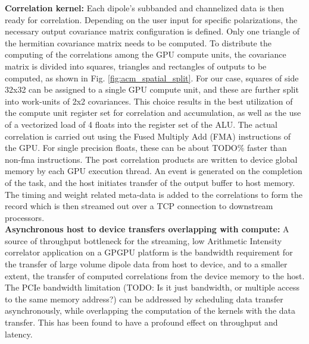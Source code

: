 \documentclass{ws-jai}
\begin{document}
\noindent \textbf {Correlation kernel:}  Each dipole's subbanded and channelized
data is  then ready for correlation.   Depending on the user  input for specific
polarizations,  the   necessary  output   covariance  matrix   configuration  is
defined.  Only one  triangle  of the  hermitian covariance  matrix  needs to  be
computed. To distribute the computing of  the correlations among the GPU compute
units, the covariance  matrix is divided into squares,  triangles and rectangles
of outputs  to be computed,  as shown in Fig.   \ref{fig:acm_spatial_split}. For
our case, squares  of side 32x32 can  be assigned to a single  GPU compute unit,
and these  are further  split into  work-units of  2x2 covariances.  This choice
results in the best utilization of the compute unit register set for correlation
and accumulation, as well  as the use of a vectorized load of  4 floats into the
register set of the ALU.  The actual  correlation is carried out using the Fused
Multiply Add (FMA) instructions of the  GPU.  For single precision floats, these
can  be about  TODO\% faster  than non-fma  instructions.  The  post correlation
products are written  to device global memory by each  GPU execution thread.  An
event  is generated  on  the completion  of  the task,  and  the host  initiates
transfer of  the output  buffer to  host memory. The  timing and  weight related
meta-data is added to the correlations to form the record which is then streamed
out over a TCP connection to downstream processors.\\

\noindent  \textbf  {Asynchronous  host  to device  transfers  overlapping  with
  compute:} A source of throughput  bottleneck for the streaming, low Arithmetic
Intensity  correlator  application   on  a  GPGPU  platform   is  the  bandwidth
requirement for  the transfer of large  volume dipole data from  host to device,
and to a  smaller extent, the transfer of computed  correlations from the device
memory to the  host. The PCIe bandwidth limitation (TODO:  Is it just bandwidth,
or multiple access  to the same memory address?) can  be addressed by scheduling
data transfer asynchronously,  while overlapping the computation  of the kernels
with  the data  transfer.  This  has been  found to  have a  profound effect  on
throughput and latency.\\
\end{document}
